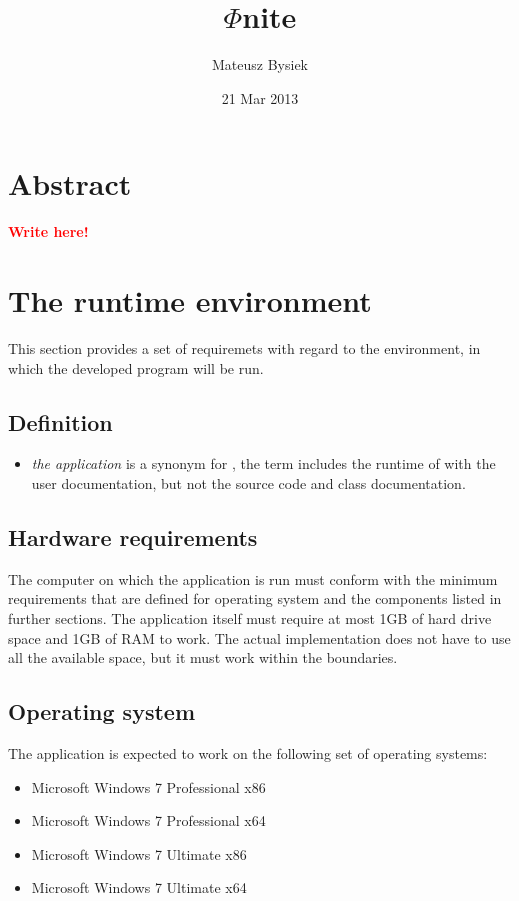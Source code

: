 \documentclass{article}
\title{$\Phi$nite}
\author{Mateusz Bysiek}
\date{21 Mar 2013}
\newcommand{\writehere}{\textbf{\textcolor{red}{Write here!}}}
\begin{document}


\section*{Abstract}

\writehere

\section{The runtime environment}

This section provides a set of requiremets with regard to the environment, in which the developed
program will be run.

\subsection*{Definition}

\begin{itemize}

  \item \textit{the application} is a synonym for \titletext, the term includes the runtime of
  \titletext{} with the user documentation, but not the source code and class documentation.

\end{itemize}

\subsection{Hardware requirements}

The computer on which the application is run must conform with the minimum requirements that are
defined for operating system and the components listed in further sections. The application itself
must require at most 1GB of hard drive space and 1GB of RAM to work. The actual implementation does
not have to use all the available space, but it must work within the boundaries.

\subsection{Operating system}

The application is expected to work on the following set of operating systems:

\begin{itemize}

  \item Microsoft Windows 7 Professional x86

  \item Microsoft Windows 7 Professional x64

  \item Microsoft Windows 7 Ultimate x86

  \item Microsoft Windows 7 Ultimate x64

\end{itemize}
\end{document}
